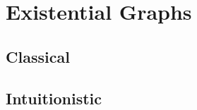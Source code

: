 \setchapterpreamble[u]{\margintoc}
\chapter{Existential Graphs}

\section{Classical}

\section{Intuitionistic}